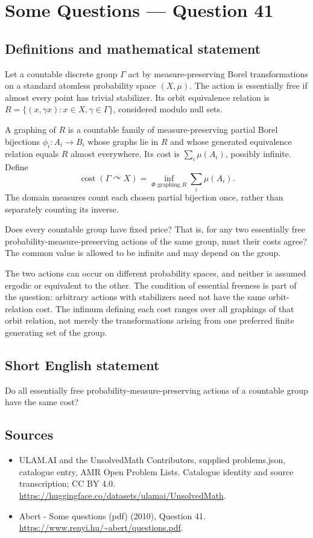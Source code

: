 \documentclass[11pt,a4paper]{article}
\begin{document}
\section*{Some Questions — Question 41}\label{statement}

\subsection{Definitions and mathematical statement}
Let a countable discrete group $\Gamma$ act by measure-preserving Borel transformations on a standard atomless probability space $(X,\mu)$. The action is essentially free if almost every point has trivial stabilizer. Its orbit equivalence relation is $R=\{(x,\gamma x):x\in X,\gamma\in\Gamma\}$, considered modulo null sets.

A graphing of $R$ is a countable family of measure-preserving partial Borel bijections $\phi_i:A_i\to B_i$ whose graphs lie in $R$ and whose generated equivalence relation equals $R$ almost everywhere. Its cost is $\sum_i\mu(A_i)$, possibly infinite. Define
\[
 \operatorname{cost}(\Gamma\curvearrowright X)
   =\inf_{\Phi\text{ graphing }R}\sum_i\mu(A_i).
\]
The domain measures count each chosen partial bijection once, rather than separately counting its inverse.

Does every countable group have fixed price? That is, for any two essentially free probability-measure-preserving actions of the same group, must their costs agree? The common value is allowed to be infinite and may depend on the group.

The two actions can occur on different probability spaces, and neither is assumed ergodic or equivalent to the other. The condition of essential freeness is part of the question: arbitrary actions with stabilizers need not have the same orbit-relation cost. The infimum defining each cost ranges over all graphings of that orbit relation, not merely the transformations arising from one preferred finite generating set of the group.
\subsection{Short English statement}
Do all essentially free probability-measure-preserving actions of a countable group have the same cost?
\subsection{Sources}
\begin{itemize}
\item[S1] ULAM.AI and the UnsolvedMath Contributors, supplied problems.json, catalogue entry, AMR Open Problem Lists. Catalogue identity and source transcription; CC BY 4.0.
\url{https://huggingface.co/datasets/ulamai/UnsolvedMath}.
\item[S2] Abert - Some questions (pdf) (2010), Question 41. 
\url{https://www.renyi.hu/~abert/questions.pdf}.
\end{itemize}
\end{document}
